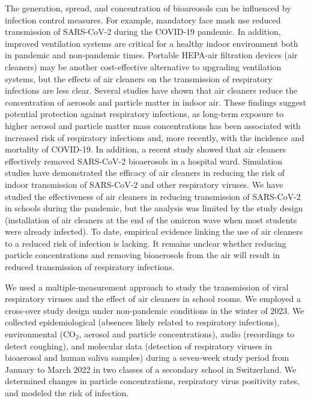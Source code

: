 \documentclass[fleqn,11pt]{wlscirep}
\begin{document}
The generation, spread, and concentration of bioareosols can be influenced by infection control measures. For example, mandatory face mask use reduced transmission of SARS-CoV-2 during the COVID-19 pandemic\cite{Gettings2021,Heinsohn2022,Leech2022PNAS,Mitze2020PNAS,Banholzer2021PLOS}. In addition, improved ventilation systems are critical for a healthy indoor environment both in pandemic and non-pandemic times\cite{Wang2021,Morawska2021}. Portable HEPA-air filtration devices (air cleaners) may be another cost-effective alternative to upgrading ventilation systems, but the effects of air cleaners on the transmission of respiratory infections are less clear. Several studies have shown that air cleaners reduce the concentration of aerosols and particle matter in indoor air\cite{Park2020Build,Buising2022InfContr,Ren2021Dent,Banholzer2023PLoSMed}. These findings suggest potential protection against respiratory infections, as long-term exposure to higher aerosol and particle matter mass concentrations has been associated with increased risk of respiratory infections\cite{Gordon2014Resp} and, more recently, with the incidence and mortality of COVID-19\cite{Kelly2023Atmos,Veronesi2022OccEnvMed,Travaglio2021EnvPoll,DeAngelis2021EnvRes}. In addition, a recent study showed that air cleaners effectively removed SARS-CoV-2 bioaerosols in a hospital ward\cite{Morris2022}. Simulation studies have demonstrated the efficacy of air cleaners in reducing the risk of indoor transmission  of SARS-CoV-2\cite{Lindsley2021} and other respiratory viruses\cite{Cortellessa2023Build}.  We have studied the effectiveness of air cleaners in reducing transmission of SARS-CoV-2 in schools during the pandemic\cite{Banholzer2023PLoSMed}, but the analysis was limited by the study design (installation of air cleaners at the end of the omicron wave when most students were already infected). To date, empirical evidence linking the use of air cleaners to a reduced risk of infection is lacking. It remains unclear whether reducing particle concentrations and removing bioaerosols from the air will result in reduced transmission of respiratory infections. 

We used a multiple-measurement approach to study the transmission of viral respiratory viruses and the effect of air cleaners in school rooms. We employed a cross-over study design under non-pandemic conditions in the winter of 2023. We collected epidemiological (absences likely related to respiratory infections), environmental (CO$_2$, aerosol and particle concentrations), audio (recordings to detect coughing), and molecular data (detection of respiratory viruses in bioaerosol and human saliva samples) during a seven-week study period from January to March 2022 in two classes of a secondary school in Switzerland. We determined changes in particle concentrations, respiratory virus positivity rates, and modeled the risk of infection.
\end{document}
